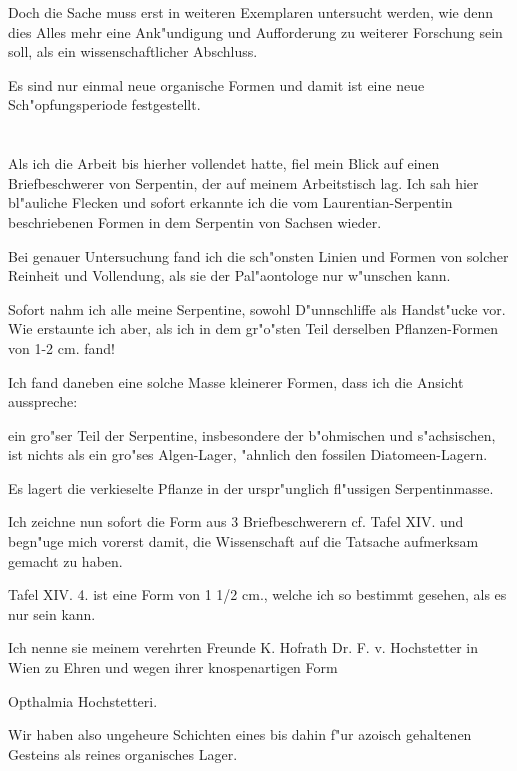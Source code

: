 \documentclass[a4paper, 11pt, oneside, german]{article}
\begin{document}
Doch die Sache muss erst in weiteren Exemplaren untersucht werden, wie denn dies Alles mehr eine Ank"undigung und Aufforderung zu weiterer Forschung sein soll, als ein wissenschaftlicher Abschluss.

Es sind nur einmal neue organische Formen und damit ist eine neue Sch"opfungsperiode festgestellt.
\clearpage
\section{}
\paragraph{}
Als ich die Arbeit bis hierher vollendet hatte, fiel mein Blick auf einen Briefbeschwerer von Serpentin, der auf meinem Arbeitstisch lag. Ich sah hier bl"auliche Flecken und sofort erkannte ich die vom Laurentian-Serpentin beschriebenen Formen in dem Serpentin von Sachsen wieder.

Bei genauer Untersuchung fand ich die sch"onsten Linien und Formen von solcher Reinheit und Vollendung, als sie der Pal"aontologe nur w"unschen kann.

Sofort nahm ich alle meine Serpentine, sowohl D"unnschliffe als Handst"ucke vor. Wie erstaunte ich aber, als ich in dem gr"o"sten Teil derselben Pflanzen-Formen von 1-2 cm. fand!

Ich fand daneben eine solche Masse kleinerer Formen, dass ich die Ansicht ausspreche:

ein gro"ser Teil der Serpentine, insbesondere der b"ohmischen und s"achsischen, ist nichts als ein gro"ses Algen-Lager, "ahnlich den fossilen Diatomeen-Lagern.

Es lagert die verkieselte Pflanze in der urspr"unglich fl"ussigen Serpentinmasse.

Ich zeichne nun sofort die Form aus 3 Briefbeschwerern cf. Tafel XIV. und begn"uge mich vorerst damit, die Wissenschaft auf die Tatsache aufmerksam gemacht zu haben.

Tafel XIV. 4. ist eine Form von 1 1/2 cm., welche ich so bestimmt gesehen, als es nur sein kann.

Ich nenne sie meinem verehrten Freunde K. Hofrath Dr. F. v. Hochstetter in Wien zu Ehren und wegen ihrer knospenartigen Form

Opthalmia Hochstetteri.

Wir haben also ungeheure Schichten eines bis dahin f"ur azoisch gehaltenen Gesteins als reines organisches Lager.
\end{document}
